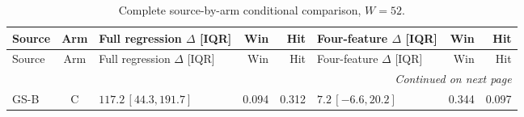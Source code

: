 \documentclass[10pt,a4paper]{article}
\begin{document}
\begingroup
\fontsize{9}{10.2}\selectfont
\setlength{\tabcolsep}{2.2pt}
\renewcommand{\arraystretch}{1.05}
\setlength{\LTpre}{2pt}
\setlength{\LTpost}{3pt}
\begin{longtable}{lcp{37mm}rrp{37mm}rr}
\caption{Complete source-by-arm conditional comparison, $W=52$.}\label{tab:v9-stability-w52}\\
\toprule
Source & Arm & Full regression $\Delta$ [IQR] & Win & Hit & Four-feature $\Delta$ [IQR] & Win & Hit\\
\midrule
\endfirsthead
\toprule
Source & Arm & Full regression $\Delta$ [IQR] & Win & Hit & Four-feature $\Delta$ [IQR] & Win & Hit\\
\midrule
\endhead
\midrule
\multicolumn{8}{r}{\emph{Continued on next page}}\\
\endfoot
\bottomrule
\endlastfoot
GS-B & C & \(117.2\,[44.3,191.7]\) & 0.094 & 0.312 & \(7.2\,[-6.6,20.2]\) & 0.344 & 0.097\\

\end{longtable}
\end{document}
